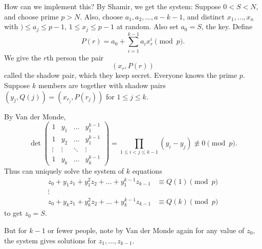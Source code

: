 \documentclass{article}
\newcommand{\1}[1]{\mathbbm{1}_{#1}}
\begin{document}
How can we implement this? By Shamir, we get the system:
Suppose $0 < S < N$, and choose prime $p > N$.
Also, choose $a_1, a_2, \dotsc, a-{k-1}$, and distinct $x_1, \dotsc, x_n$ with $) \leq a_j \leq p-1$, $1 \leq x_j \leq p-1$ at random.
Also set $a_0 = S$, the key.
Define
\begin{equation*}
    P(r) = a_0 + \sum_{i=1}^{k-1} a_i x_r^i \pmod{p}.
\end{equation*}
We give the $r$th person the pair
\begin{equation*}
    (x_r, P(r))
\end{equation*}
called the shadow pair, which they keep secret. Everyone knows the prime $p$.
Suppose $k$ members are together with shadow pairs $(y_j, Q(j)) = (x_{r_j}, P(r_j))$ for $1 \leq j \leq k$.

By Van der Monde,
\begin{equation*}
    \det
    \begin{pmatrix}
        1 & y_1 & \dots & y_1^{k-1} \\
        1 & y_2 & \dots & y_1^{k-1} \\
        \vdots & \vdots & \ddots & \vdots \\
        1 & y_k & \dots & y_k^{k-1}
    \end{pmatrix}
    = \prod_{1 \leq i < j \leq k-1} (y_i - y_j)
    \not \equiv 0 \pmod{p}.
\end{equation*}
Thus can uniquely solve the system of $k$ equations
\begin{align*}
    z_0 + y_1 z_1 + y_1^2 z_2 + \dotsc + y_1^{k-1} z_{k-1} &\equiv Q(1) \pmod{p} \\
    \vdots \\
    z_0 + y_k z_1 + y_k^2 z_2 + \dotsc + y_k^{k-1} z_{k-1} &\equiv Q(k) \pmod{p}
\end{align*}
to get $z_0 = S$.

But for $k-1$ or fewer people, note by Van der Monde again for any value of $z_0$, the system gives solutions for $z_1, \dotsc, z_{k-1}$.
\end{document}
